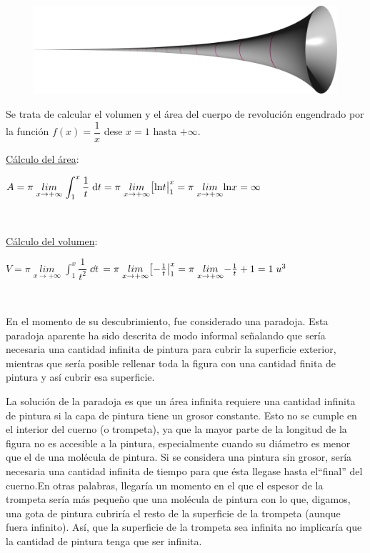  	\begin{figure}[H]
		\centering
		\includegraphics[width=1\textwidth]{imagenes/imagenes08/T08IM35.png}
	\end{figure}

Se trata de calcular el volumen y el área del cuerpo de revolución engendrado por la función $f(x)=\dfrac 1 x$ dese $x=1$ hasta $+\infty$.

\underline{Cálculo del área}: 

$A=\pi\; \underset{x \to +\infty}{lim}\;{\displaystyle \int_1^x \dfrac 1 t \; \dd t }= \pi\; \underset{x \to +\infty}{lim} {  \eval[\mathrm{ln}t|_1^x }= \pi\; \underset{x \to +\infty}{lim} { \mathrm{ln}x }= \infty$

$\quad$

\underline{Cálculo del volumen}:

 $V= \pi\; \underset{x \to +\infty}{lim}\;{\displaystyle \int_1^x \dfrac 1 {t^2} \; \dd t }$ 
$= \pi\; \underset{x \to +\infty}{lim} {  \eval[- \frac 1 t|_1^x }= \pi\; \underset{x \to +\infty}{lim} { -\frac 1 t + 1 }=1 \; u^3$

$\quad$

\textcolor{gris}{ En el momento de su descubrimiento, fue considerado una paradoja. Esta paradoja aparente ha sido descrita de modo informal señalando que sería necesaria una cantidad infinita de pintura para cubrir la superficie exterior, mientras que sería posible rellenar toda la figura con una cantidad finita de pintura y así cubrir esa superficie.}

\small{\textcolor{gris}{La solución de la paradoja es que un área infinita requiere una cantidad infinita de pintura si la capa de pintura tiene un grosor constante. Esto no se cumple en el interior del cuerno (o trompeta), ya que la mayor parte de la longitud de la figura no es accesible a la pintura, especialmente cuando su diámetro es menor que el de una molécula de pintura. Si se considera una pintura sin grosor, sería necesaria una cantidad infinita de tiempo para que ésta llegase hasta el``final'' del cuerno.En otras palabras, llegaría un momento en el que el espesor de la trompeta sería más pequeño que una molécula de pintura con lo que, digamos, una gota de pintura cubriría el resto de la superficie de la trompeta (aunque fuera infinito). Así, que la superficie de la trompeta sea infinita no implicaría que la cantidad de pintura tenga que ser infinita.}}

